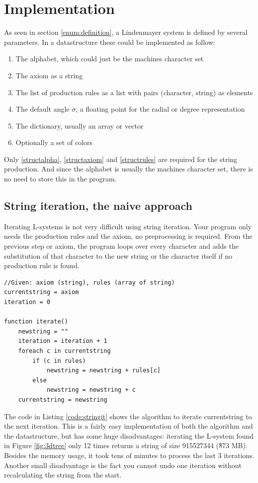 \documentclass[11pt,a4paper]{article}
\begin{document}
\newpage
\section{Implementation}

As seen in section \ref{enum:definition}, a Lindenmayer system is defined by several parameters. In a datastructure these could be implemented as follow:
\begin{enumerate}
\item The alphabet, which could just be the machines character set \label{structalpha}
\item The axiom as a string \label{structaxiom}
\item The list of production rules as a list with pairs (character, string) as elements \label{structrules}
\item The default angle $\sigma$, a floating point for the radial or degree representation
\item The dictionary, usually an array or vector
\item Optionally a set of colors
\end{enumerate}
Only \ref{structalpha}, \ref{structaxiom} and \ref{structrules} are required for the string production. And since the alphabet is usually the machines character set, there is no need to store this in the program.

\subsection{String iteration, the naive approach}

Iterating L-systems is not very difficult using string iteration. Your program only needs the production rules and the axiom, no preprocessing is required. From the previous step or axiom, the program loops over every character and adds the substitution of that character to the new string or the character itself if no production rule is found.

\lstset{label=code:stringit,caption=String iteration}
\begin{lstlisting}
//Given: axiom (string), rules (array of string)
currentstring = axiom
iteration = 0

function iterate()
	newstring = ""
	iteration = iteration + 1
	foreach c in currentstring
		if (c in rules)
			newstring = newstring + rules[c]
		else
			newstring = newstring + c
	currentstring = newstring
\end{lstlisting}

The code in Listing \ref{code:stringit} shows the algorithm to iterate currentstring to the next iteration. This is a fairly easy implementation of both the algorithm and the datastructure, but has some huge disadvantages: iterating the L-system found in Figure \ref{fig:3dtree} only 12 times returns a string of size 915527344 (\~873 MB). Besides the memory usage, it took tens of minutes to process the last 3 iterations. Another small disadvantage is the fact you cannot undo one iteration without recalculating the string from the start.
\end{document}

